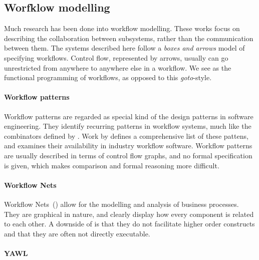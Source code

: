 


\subsection{Worfklow modelling}

Much research has been done into workflow modelling. These works focus on
describing the collaboration between subsystems, rather than the communication
between them.
The systems described here follow a \emph{boxes and arrows} model of specifying workflows.
Control flow, represented by arrows, usually can go unrestricted from anywhere to anywhere else in a workflow.
We see \TOP as the functional programming of workflows, as opposed to this \emph{goto}-style.


\paragraph{Workflow patterns}

Workflow patterns are regarded as special kind of the design patterns in
software engineering. They identify recurring patterns in workflow systems, much
like the combinators defined by \TOPHAT. Work by \citet{journals/dpd/AalstHKB03}
defines a comprehensive list of these
pattens, and examines their availability in industry workflow software.
Workflow patterns are usually described in terms of control flow graphs, and no
formal specification is given, which makes comparison and formal reasoning more
difficult.

\paragraph{Workflow Nets}

Workflow Nets~(\WFN)\cite{journals/jcsc/Aalst98} allow for the modelling and analysis
of business processes. They are graphical in nature, and clearly display how
every component is related to each other. A downside of \WFN is that
they do not facilitate higher order constructs and that they are often not
directly executable.

\paragraph{YAWL}

